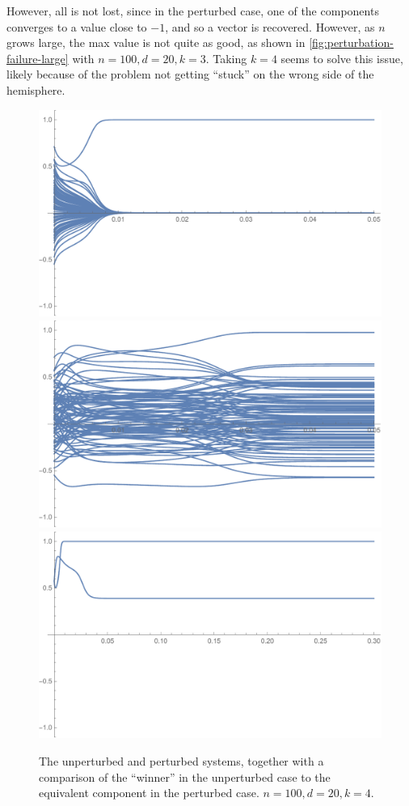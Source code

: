 \documentclass{hw-scrartcl}
\begin{document}
However, all is not lost, since in the perturbed case, one of the components converges to a value close to \(-1\), and so a vector is recovered. However, as \(n\) grows large, the max value is not quite as good, as shown in \cref{fig:perturbation-failure-large} with \(n = 100, d=20, k=3\). Taking \(k = 4\) seems to solve this issue, likely because of the problem not getting ``stuck'' on the wrong side of the hemisphere.

\begin{figure}[p]
  \centering
  \includegraphics[width=\linewidth*2/3]{perturbation-analysis-failure/unperturbed-large-4.pdf}
  \vfill
  \includegraphics[width=\linewidth*2/3]{perturbation-analysis-failure/perturbed-large-4.pdf}
  \vfill
  \includegraphics[width=\linewidth*2/3]{perturbation-analysis-failure/max-comparison-large-4.pdf}
  \caption{The unperturbed and perturbed systems, together with a comparison of the ``winner'' in the unperturbed case to the equivalent component in the perturbed case. \(n = 100, d=20, k=4.\)}
  \label{fig:perturbation-failure-large-4}
\end{figure}
\end{document}
